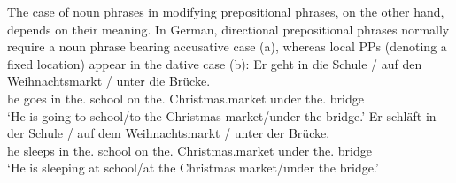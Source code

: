 \eal
{}
\zl
\largerpage%
The case of noun phrases in modifying prepositional phrases, on the other hand, depends on their meaning. In German, directional prepositional phrases
normally require a noun phrase bearing accusative case (a), whereas local PPs (denoting a
fixed location) appear in the dative case (b):
\eal
\ex
\gll Er geht in die Schule / auf den Weihnachtsmarkt / unter die Brücke.\\
	 he goes in the.\acc{} school {} on the.\acc{} Christmas.market {} under the.\acc{} bridge\\
\glt `He is going to school/to the Christmas market/under the bridge.'
\ex 
\gll Er schläft in der Schule / auf dem Weihnachtsmarkt / unter der Brücke.\\
	 he sleeps in the.\dat{} school {} on the.\dat{} Christmas.market {} under the.\dat{} bridge\\
\glt `He is sleeping at school/at the Christmas market/under the bridge.'
\zl

